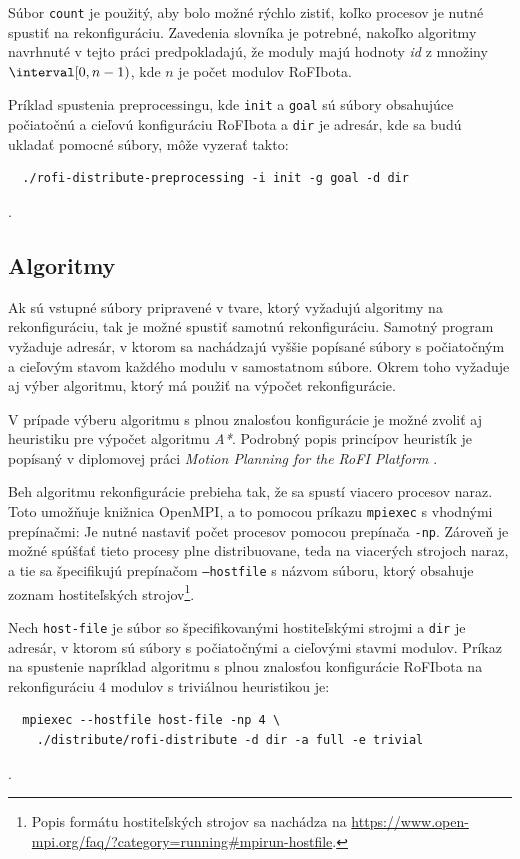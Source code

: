 \documentclass[
  digital, %
  oneside, %
  notable,   %
  lof,     %
  nolot,     %
]{fithesis3}
\begin{document}
Súbor \texttt{count} je použitý, aby bolo možné rýchlo zistiť, koľko procesov je nutné spustiť na rekonfiguráciu. Zavedenia slovníka je potrebné, nakoľko algoritmy navrhnuté v tejto práci predpokladajú, že moduly majú hodnoty \textit{id} z množiny $\interval[0, n - 1)$, kde $n$ je počet modulov RoFIbota.

Príklad spustenia preprocessingu, kde \texttt{init} a \texttt{goal} sú súbory obsahujúce počiatočnú a cieľovú konfiguráciu RoFIbota a \texttt{dir} je adresár, kde sa budú ukladať pomocné súbory, môže vyzerať takto:

\begin{verbatim}
  ./rofi-distribute-preprocessing -i init -g goal -d dir
\end{verbatim}.

\subsection{Algoritmy}
Ak sú vstupné súbory pripravené v tvare, ktorý vyžadujú algoritmy na rekonfiguráciu, tak je možné spustiť samotnú rekonfiguráciu. Samotný program vyžaduje adresár, v ktorom sa nachádzajú vyššie popísané súbory s počiatočným a cieľovým stavom každého modulu v samostatnom súbore. Okrem toho vyžaduje aj výber algoritmu, ktorý má použiť na výpočet rekonfigurácie. 

V prípade výberu algoritmu s plnou znalosťou konfigurácie je možné zvoliť aj heuristiku pre výpočet algoritmu \textit{A*}. Podrobný popis princípov heuristík je popísaný v diplomovej práci \textit{Motion Planning for the RoFI Platform} \cite{vozarovaMasterThesis}. 

Beh algoritmu rekonfigurácie prebieha tak, že sa spustí viacero procesov naraz. Toto umožňuje knižnica OpenMPI, a to pomocou príkazu \texttt{mpiexec} s vhodnými prepínačmi: Je nutné nastaviť počet procesov pomocou prepínača \texttt{-np}. Zároveň je možné spúšťať tieto procesy plne distribuovane, teda na viacerých strojoch naraz, a tie sa špecifikujú prepínačom \texttt{--hostfile} s názvom súboru, ktorý obsahuje zoznam hostiteľských strojov\footnote{Popis formátu hostiteľských strojov sa nachádza na \url{https://www.open-mpi.org/faq/?category=running\#mpirun-hostfile}.}. 

Nech \texttt{host-file} je súbor so špecifikovanými hostiteľskými strojmi a \texttt{dir} je adresár, v ktorom sú súbory s počiatočnými a cieľovými stavmi modulov. Príkaz na spustenie napríklad algoritmu s plnou znalosťou konfigurácie RoFIbota na rekonfiguráciu $4$ modulov s triviálnou heuristikou je: 
\begin{verbatim}
  mpiexec --hostfile host-file -np 4 \
    ./distribute/rofi-distribute -d dir -a full -e trivial
\end{verbatim}.
\end{document}
